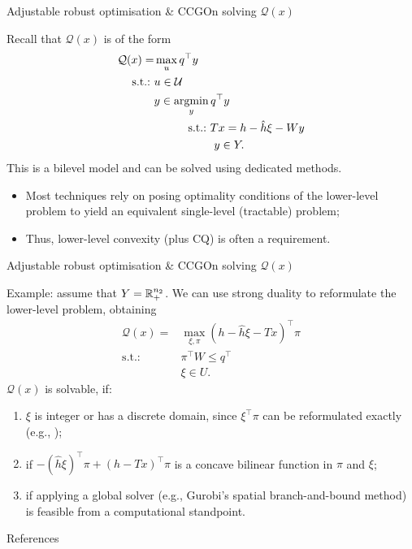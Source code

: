 \begin{frame}{Adjustable robust optimisation \& CCG}{On solving $\mathcal{Q}(x)$}

	Recall that $\mathcal{Q}(x)$  is of the form
	\begin{align*}
	\mathcal{Q}(x)	 = &\max_u q^\top y    \\
	   \st &u \in \mathcal{U}  \\ 	 
		   &y \in \argmin_y q^\top y \\
	       &\qquad \quad \text{s.t.:~} Tx = h - \hat{h} \xi - Wy \\
	       &\qquad \quad \phantom{~\text{s.t.:~}} y \in Y. 
	\end{align*}
	\pause
	This is a \alert{bilevel model} and can be solved using dedicated methods.
	\vspace{-6pt}
	\begin{itemize}
		\item Most techniques rely on \alert{posing optimality conditions} of the lower-level problem to yield an \alert{equivalent single-level} (tractable) problem;
		\item Thus, \alert{lower-level convexity} (plus CQ) is often a requirement.
	\end{itemize}

\end{frame}


\begin{frame}{Adjustable robust optimisation \& CCG}{On solving $\mathcal{Q}(x)$}

	Example: assume that $Y = \mathbb R_+^{n_2}$. We can use strong duality to reformulate the lower-level problem, obtaining
	\begin{align*}
		\mathcal{Q}(x) = &\max_{\xi,\pi} (h - \hat{h} \xi - Tx)^\top \pi \\
		   \text{s.t.:~} & \pi^\top W \leq q^\top \\
		   	   & \xi \in U.	 
	\end{align*}
	\pause
	$\mathcal{Q}(x)$ is solvable, if:
	\vspace{-6pt} 
	\begin{enumerate}
		\item $\xi$ is integer or has a discrete domain, since $\xi^\top \pi$ can be reformulated exactly (e.g., {\small \cite{rintamaki2023achieving}});
		\item if $-(\hat{h}\xi)^\top \pi + (h - Tx)^\top \pi$ is a \alert{concave bilinear} function in $\pi$ and $\xi$;
		\item if applying a \alert{global solver} (e.g., Gurobi's spatial branch-and-bound method) is feasible from a computational standpoint.	
	\end{enumerate}

	
\end{frame}

\begin{frame}[allowframebreaks]{References}
	
	
\end{frame}

